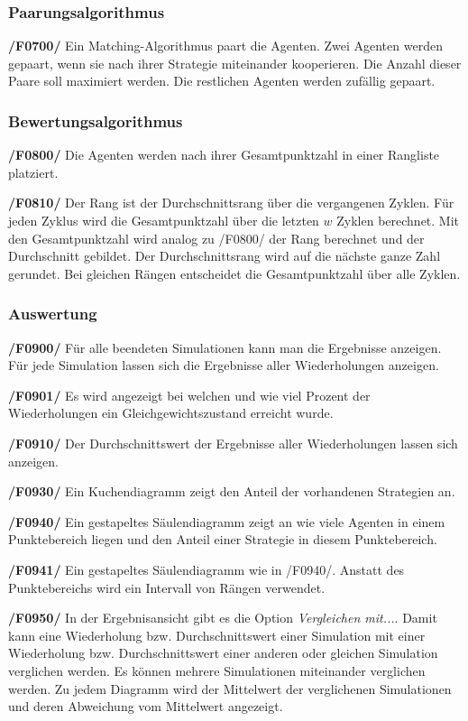 \subsubsection{Paarungsalgorithmus}

\textbf{/F0700/}
Ein Matching-Algorithmus paart die Agenten. Zwei Agenten werden gepaart, wenn sie nach ihrer Strategie miteinander kooperieren. Die Anzahl dieser Paare soll maximiert werden. Die restlichen Agenten werden zufällig gepaart.

\subsubsection{Bewertungsalgorithmus}

\textbf{/F0800/}
Die Agenten werden nach ihrer Gesamtpunktzahl in einer Rangliste platziert.

\textbf{/F0810/}
Der Rang ist der Durchschnittsrang über die vergangenen Zyklen. Für jeden Zyklus wird die Gesamtpunktzahl über die letzten $w$ Zyklen berechnet. Mit den Gesamtpunktzahl wird analog zu /F0800/ der Rang berechnet und der Durchschnitt gebildet. Der Durchschnittsrang wird auf die nächste ganze Zahl gerundet. Bei gleichen Rängen entscheidet die Gesamtpunktzahl über alle Zyklen.

\subsubsection{Auswertung}

\textbf{/F0900/}
Für alle beendeten Simulationen kann man die Ergebnisse anzeigen. Für jede Simulation lassen sich die Ergebnisse aller Wiederholungen anzeigen.

{\color{red}
\textbf{/F0901/}
Es wird angezeigt bei welchen und wie viel Prozent der Wiederholungen ein Gleichgewichtszustand erreicht wurde.
}

\textbf{/F0910/}
Der Durchschnittswert der Ergebnisse aller Wiederholungen lassen sich anzeigen.

\textbf{/F0930/}
Ein Kuchendiagramm zeigt den Anteil der vorhandenen Strategien an.

\textbf{/F0940/}
Ein gestapeltes Säulendiagramm zeigt an wie viele Agenten in einem Punktebereich liegen und den Anteil einer Strategie in diesem Punktebereich.

{\color{red}\textbf{/F0941/}
Ein gestapeltes Säulendiagramm wie in /F0940/. Anstatt des Punktebereichs wird ein Intervall von Rängen verwendet.}

\textbf{/F0950/}
In der Ergebnisansicht gibt es die Option \emph{Vergleichen mit...}. Damit kann eine Wiederholung bzw. Durchschnittswert einer Simulation mit einer Wiederholung bzw. Durchschnittswert einer anderen oder gleichen Simulation verglichen werden. {\color{red} Es können mehrere Simulationen miteinander verglichen werden. Zu jedem Diagramm wird der Mittelwert der verglichenen Simulationen und deren Abweichung vom Mittelwert angezeigt.}

